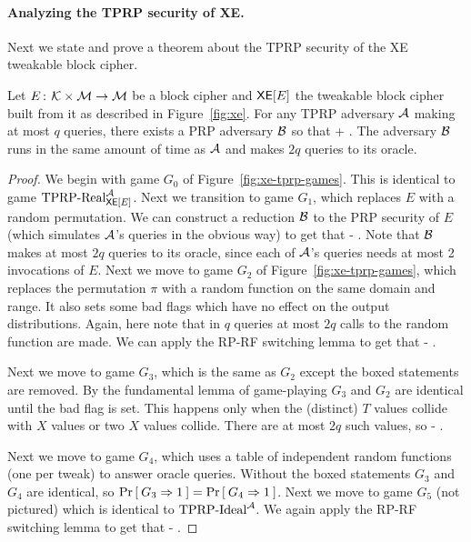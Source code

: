 \paragraph{Analyzing the TPRP security of XE.} Next we state and prove a theorem about the TPRP security of the XE tweakable block cipher.

\begin{theorem}
  Let $E{{\kern .05em}\colon{\kern .05em}}{\cal K}\times{\cal M}\rightarrow{\cal M}$ be a block cipher and $\mathsf{XE}[E]$ the tweakable block cipher built from it as described in Figure~\ref{fig:xe}. For any TPRP adversary ${\mathcal A}$ making at most $q$ queries, there exists a PRP adversary ${\mathcal B}$ so that
  \bnm
  \AdvTPRP{\xe[E]}{\advA} \leq {} + \; .
  \enm
  The adversary ${\mathcal B}$ runs in the same amount of time as ${\mathcal A}$ and makes $2q$ queries to its oracle.
\end{theorem}
\begin{proof}
  We begin with game $G_0$ of Figure~\ref{fig:xe-tprp-games}. This is identical to game $\text{TPRP-Real}^{\mathcal A}_{\mathsf{XE}[E]}$. Next we transition to game $G_1$, which replaces $E$ with a random permutation. We can construct a reduction ${\mathcal B}$ to the PRP security of $E$ (which simulates ${\mathcal A}$'s queries in the obvious way) to get that
  \bnm
  \left\lvert{} - \right\rvert \leq {}\; .
  \enm
  Note that ${\mathcal B}$ makes at most $2q$ queries to its oracle, since each of ${\mathcal A}$'s queries needs at most 2 invocations of $E$. Next we move to game $G_2$ of Figure~\ref{fig:xe-tprp-games}, which replaces the permutation $\pi$ with a random function on the same domain and range. It also sets some bad flags which have no effect on the output distributions. Again, here note that in $q$ queries at most $2q$ calls to the random function are made. We can apply the RP-RF switching lemma to get that
  \bnm
  \left\lvert{} - \right\rvert \leq {}\; .
  \enm

  Next we move to game $G_3$, which is the same as $G_2$ except the boxed statements are removed. By the fundamental lemma of game-playing $G_3$ and $G_2$ are identical until the bad flag is set.
  This happens only when the (distinct) $T$ values collide with $X$ values or two $X$ values collide. There are at most $2q$ such values, so
  \bnm
  \left\lvert{} - \right\rvert \leq {}\; .
  \enm

  Next we move to game $G_4$, which uses a table of independent random functions (one per tweak) to answer oracle queries. Without the boxed statements $G_3$ and $G_4$ are identical, so $\Pr\left[\: G_3\Rightarrow 1 \:\right] = \Pr\left[\: G_4\Rightarrow 1 \:\right]$. Next we move to game $G_5$ (not pictured) which is identical to $\text{TPRP-Ideal}^{\mathcal A}$. We again apply the RP-RF switching lemma to get that
  \bnm
  \left\lvert{} - \right\rvert \leq {}\; .
  \enm
\end{proof}

